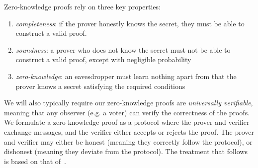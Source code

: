 \documentclass[12pt,a4paper]{article}
\theoremstyle{definition}
\begin{document}
Zero-knowledge proofs rely on three key properties:
\begin{enumerate}
    \item \textit{completeness}: if the prover honestly knows the secret, they must be able to construct a valid proof.
    \item \textit{soundness}: a prover who does not know the secret must not be able to construct a valid proof, except with negligible probability
    \item \textit{zero-knowledge}: an eavesdropper must learn nothing apart from that the prover knows a secret satisfying the required conditions
\end{enumerate}
We will also typically require our zero-knowledge proofs are \textit{universally verifiable}, meaning that any observer (e.g. a voter) can verify the correctness of the proofs. We formulate a zero-knowledge proof as a protocol where the prover and verifier exchange messages, and the verifier either accepts or rejects the proof. The prover and verifier may either be honest (meaning they correctly follow the protocol), or dishonest (meaning they deviate from the protocol). The treatment that follows is based on that of~\cite{boneh2020graduate}.
\end{document}
